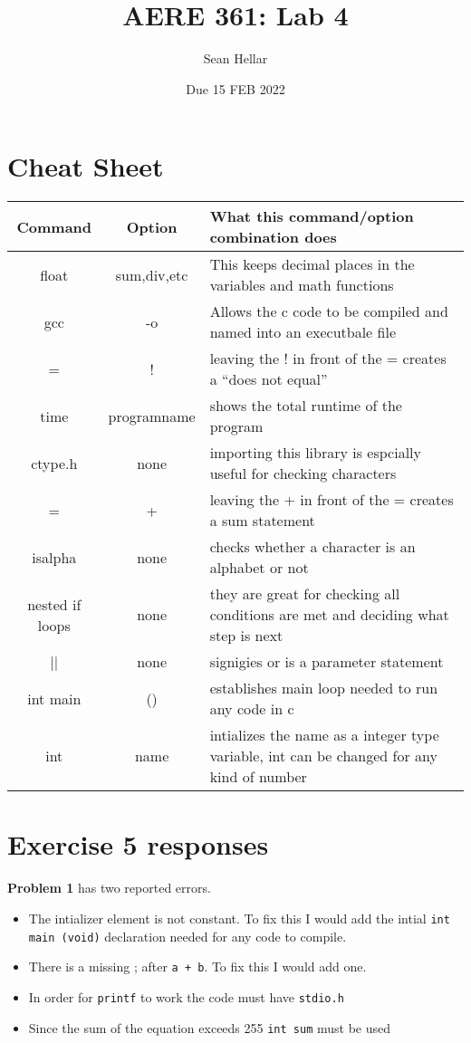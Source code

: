 \documentclass{article}
\title{AERE 361: Lab 4}
\date{Due 15 FEB 2022}
\author{Sean Hellar}
\begin{document}
\maketitle
\newpage

\section{Cheat Sheet}

\begin{tabular}{|c|c|p{4.2in}|}
  \hline
  Command & Option & What this command/option combination does \\
  \hline
  \hline
  float & sum,div,etc & This keeps decimal places in the variables and math functions \\
  \hline
  \hline
  gcc & -o & Allows the c code to be compiled and named into an executbale file \\
  \hline
  \hline
  = & ! & leaving the ! in front of the = creates a ``does not equal'' \\
  \hline
  \hline
  time & programname & shows the total runtime of the program  \\
  \hline
  \hline
  ctype.h & none & importing this library is espcially useful for checking characters \\
  \hline
  \hline
  = & + & leaving the + in front of the = creates a sum statement \\
  \hline
  \hline
  isalpha & none & checks whether a character is an alphabet or not \\
  \hline
  \hline
  nested if loops & none & they are great for checking all conditions are met and deciding what step is next \\
  \hline
  \hline
  || & none & signigies or is a parameter statement \\
  \hline
  \hline
  int main & () & establishes main loop needed to run any code in c \\
  \hline
  \hline
  int & name & intializes the name as a integer type variable, int can be changed for any kind of number \\
  \hline
\end{tabular}



\newpage
\section{Exercise 5 responses}

\textbf{Problem 1} has two reported errors.
\begin{itemize}
  \item{The intializer element is not constant. To fix this I would add the intial \texttt{int main (void)} declaration needed for any code to compile.}
  \item{There is a missing ; after \texttt{a + b}. To fix this I would add one.}
  \item{In order for \texttt{printf} to work the code must have \texttt{stdio.h}}
  \item{Since the sum of the equation exceeds 255 \texttt{int sum} must be used}
\end{itemize}
      
\end{document}
